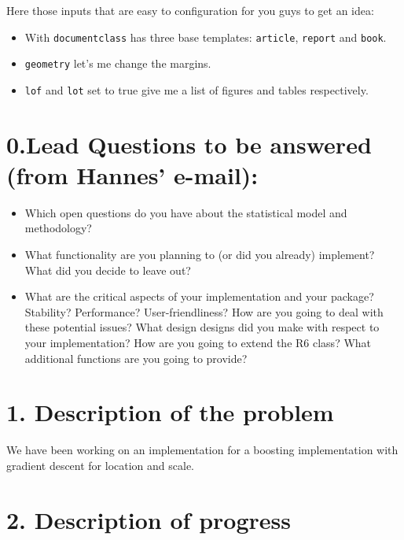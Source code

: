 \documentclass[
]{report}
\providecommand{\tightlist}{%
  \setlength{\itemsep}{0pt}\setlength{\parskip}{0pt}}
\begin{document}
Here those inputs that are easy to configuration for you guys to get an
idea:

\begin{itemize}
\tightlist
\item
  With \texttt{documentclass} has three base templates:
  \texttt{article}, \texttt{report} and \texttt{book}.
\item
  \texttt{geometry} let's me change the margins.
\item
  \texttt{lof} and \texttt{lot} set to true give me a list of figures
  and tables respectively.
\end{itemize}

\hypertarget{lead-questions-to-be-answered-from-hannes-e-mail}{%
\chapter{0.Lead Questions to be answered (from Hannes'
e-mail):}\label{lead-questions-to-be-answered-from-hannes-e-mail}}

\begin{itemize}
\tightlist
\item
  Which open questions do you have about the statistical model and
  methodology?
\item
  What functionality are you planning to (or did you already) implement?
  What did you decide to leave out?
\item
  What are the critical aspects of your implementation and your package?
  Stability? Performance? User-friendliness? How are you going to deal
  with these potential issues? What design designs did you make with
  respect to your implementation? How are you going to extend the R6
  class? What additional functions are you going to provide?
\end{itemize}

\hypertarget{description-of-the-problem}{%
\chapter{1. Description of the
problem}\label{description-of-the-problem}}

We have been working on an implementation for a boosting implementation
with gradient descent for location and scale.

\hypertarget{description-of-progress}{%
\chapter{2. Description of progress}\label{description-of-progress}}
\end{document}
